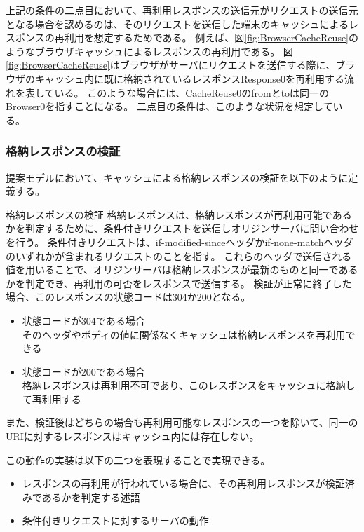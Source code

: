 \documentclass[journal]{IEEEtran}
\begin{document}
上記の条件の二点目において、再利用レスポンスの送信元がリクエストの送信元となる場合を認めるのは、そのリクエストを送信した端末のキャッシュによるレスポンスの再利用を想定するためである。
例えば、図\ref{fig:BrowserCacheReuse}のようなブラウザキャッシュによるレスポンスの再利用である。
図\ref{fig:BrowserCacheReuse}はブラウザがサーバにリクエストを送信する際に、ブラウザのキャッシュ内に既に格納されているレスポンスResponse0を再利用する流れを表している。
このような場合には、CacheReuse0のfromとtoは同一のBrowser0を指すことになる。
二点目の条件は、このような状況を想定している。


\subsubsection{格納レスポンスの検証}
\label{sec:CacheVerification}
提案モデルにおいて、キャッシュによる格納レスポンスの検証を以下のように定義する。

\begin{itembox}[l]{格納レスポンスの検証}
格納レスポンスは、格納レスポンスが再利用可能であるかを判定するために、条件付きリクエストを送信しオリジンサーバに問い合わせを行う。
条件付きリクエストは、if-modified-sinceヘッダかif-none-matchヘッダのいずれかが含まれるリクエストのことを指す。
これらのヘッダで送信される値を用いることで、オリジンサーバは格納レスポンスが最新のものと同一であるかを判定でき、再利用の可否をレスポンスで送信する。
検証が正常に終了した場合、このレスポンスの状態コードは304か200となる。
\begin{itemize}
\item 状態コードが304である場合 \\
そのヘッダやボディの値に関係なくキャッシュは格納レスポンスを再利用できる
\item 状態コードが200である場合 \\
格納レスポンスは再利用不可であり、このレスポンスをキャッシュに格納して再利用する
\end{itemize}
また、検証後はどちらの場合も再利用可能なレスポンスの一つを除いて、同一のURIに対するレスポンスはキャッシュ内には存在しない。
\end{itembox}

この動作の実装は以下の二つを表現することで実現できる。
\begin{itemize}
\item レスポンスの再利用が行われている場合に、その再利用レスポンスが検証済みであるかを判定する述語
\item 条件付きリクエストに対するサーバの動作
\end{itemize}
\end{document}
